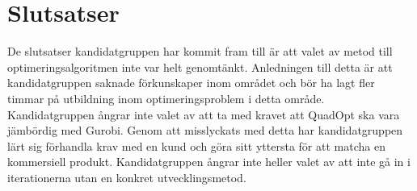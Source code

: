 \section{Slutsatser}
De slutsatser kandidatgruppen har kommit fram till är att valet av metod till optimeringsalgoritmen inte var helt genomtänkt. Anledningen till detta är att kandidatgruppen saknade förkunskaper inom området och bör ha lagt fler timmar på utbildning inom optimeringsproblem i detta område.
\newline
\newline
Kandidatgruppen ångrar inte valet av att ta med kravet att QuadOpt ska vara jämbördig med Gurobi. Genom att misslyckats med detta har kandidatgruppen lärt sig förhandla krav med en kund och göra sitt yttersta för att matcha en kommersiell produkt.
\newline
\newline
Kandidatgruppen ångrar inte heller valet av att inte gå in i iterationerna utan en konkret utvecklingsmetod. 
